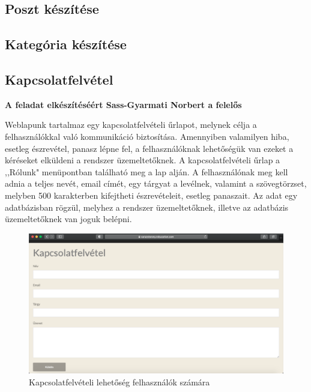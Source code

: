 \documentclass[
]{thesis-ekf}
\theoremstyle{definition}
\theoremstyle{remark}
\begin{document}
		\subsection{Poszt készítése}
		\subsection{Kategória készítése}
		\subsection{Kapcsolatfelvétel}
			\par \textbf{A feladat elkészítéséért Sass-Gyarmati Norbert a felelős}
			\par Weblapunk tartalmaz egy kapcsolatfelvételi űrlapot, melynek célja a felhasználókkal való kommunikáció biztosítása. Amennyiben valamilyen hiba, esetleg észrevétel, panasz lépne fel, a felhasználóknak lehetőségük van ezeket a kéréseket elküldeni a rendszer üzemeltetőknek. A kapcsolatfelvételi űrlap a ,,Rólunk" menüpontban található meg a lap alján. A felhasználónak meg kell adnia a teljes nevét, email címét, egy tárgyat a levélnek, valamint a szövegtörzset, melyben 500 karakterben kifejtheti észrevételeit, esetleg panaszait. Az adat egy adatbázisban rögzül, melyhez a rendszer üzemeltetőknek, illetve az adatbázis üzemeltetőknek van joguk belépni.
			\begin{figure}[ht]
				\centering
				\includegraphics[scale=0.30]{./images/contactme}
				\caption{Kapcsolatfelvételi lehetőség felhasználók számára}
				\label{fig:contactme}
			\end{figure}
\end{document}
